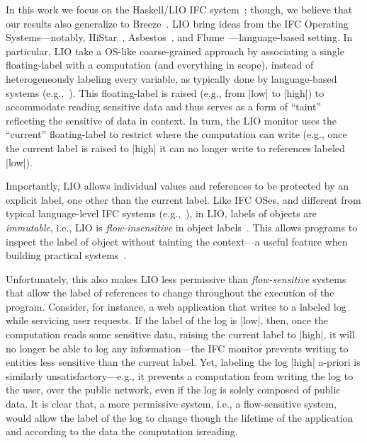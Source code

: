 In this work we focus on the Haskell/LIO IFC system~\cite{stefan:lio,
stefan:addressing-covert}; though, we believe that our results also
generalize to Breeze~\cite{Breeze}.
%
LIO bring ideas from the IFC Operating Systems---notably,
HiStar~\cite{zeldovich:histar}, Asbestos~\cite{Efstathopoulos:2005},
and Flume~\cite{krohn:flume}---language-based setting.
%
In particular, LIO take a OS-like coarse-grained approach by
associating a single floating-label with a computation (and everything
in scope), instead of heterogeneously labeling every variable, as
typically done by language-based systems (e.g.,~\cite{jif,FlowCaml}).
%
This floating-label is raised (e.g., from |low| to |high|) to
accommodate reading sensitive data and thus serves as a form of
``taint'' reflecting the sensitive of data in context.
%
In turn, the LIO monitor uses the ``current'' floating-label to
restrict where the computation can write (e.g., once the current label
is raised to |high| it can no longer write to references labeled
|low|).

Importantly, LIO allows individual values and references to be
protected by an explicit label, one other than the current label.
%
Like IFC OSes, and different from typical language-level IFC systems
(e.g.,~\cite{jif,FlowCaml,Hedin13}), in LIO, labels of objects are
\emph{immutable}, i.e., LIO is \emph{flow-insensitive} in object
labels~\cite{Hunt:2006}.
%
This allows programs to inspect the label of object without tainting
the context---a useful feature when building practical
systems~\cite{giffin:hails, Breeze}.

Unfortunately, this also makes LIO less permissive than
\emph{flow-sensitive} systems that allow the label of references to
change throughout the execution of the program. 
%
Consider, for instance, a web application that writes to a labeled
log while servicing user requests.
%
If the label of the log is |low|, then, once the computation reads
some sensitive data, raising the current label to |high|, it will no
longer be able to log any information---the IFC monitor prevents
writing to entities less sensitive than the current label.
%
Yet, labeling the log |high| a-priori is similarly
unsatisfactory---e.g., it prevents a computation from writing the log
to the user, over the public network, even if the log is solely
composed of public data.
%
It is clear that, a more permissive system, i.e., a flow-sensitive
system, would allow the label of the log to change though the lifetime
of the application and according to the data the computation isreading.



